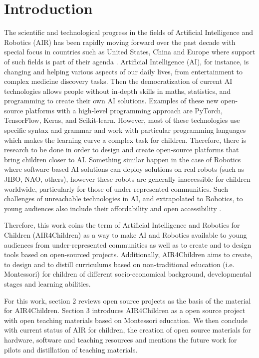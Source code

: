 \documentclass[sigconf]{acmart}
\begin{document}
\maketitle

\section{Introduction} 
The scientific and technological progress in the fields of Artificial Intelligence and Robotics (AIR) has been rapidly moving forward over the past decade with special focus in countries such as United States, China and Europe where support of such fields is part of their agenda \cite{Savage2020}. 
Artificial Intelligence (AI), for instance, is changing and helping various aspects of our daily lives, from entertainment to complex medicine discovery tasks. 
Then the democratization of current AI technologies allows people without in-depth skills in maths, statistics, and programming to create their own AI solutions. Examples of these new open-source platforms with a high-level programming approach are PyTorch, TensorFlow, Keras, and Scikit-learn. 
However, most of these technologies use specific syntax and grammar and work with particular programming languages which makes the learning curve a complex task for children. 
Therefore, there is research to be done in order to design and create open-source platforms that bring children closer to AI.
Something similar happen in the case of Robotics where software-based AI solutions can deploy solutions on real robots (such as JIBO, NAO, others), however these robots are generally inaccessible for children worldwide, particularly for those of under-represented communities.
Such challenges of unreachable technologies in AI, and extrapolated to Robotics, to young audiences 
also include their affordability and open accessibility \cite{UNICEF2020}.

Therefore, this work coins the term of Artificial Intelligence and Robotics for Children (AIR4Children) as a way to make AI and Robotics available to young audiences from under-represented communities as well as to create and to design tools based on open-sourced projects.
Additionally, AIR4Children aims to create, to design and to distill curriculums based on non-traditional education (i.e. Montessori) for children of different socio-economical background, developmental stages and learning abilities. 

For this work, section 2 reviews open source projects as the basis of the material for AIR4Children.
Section 3 introduces AIR4Children as a open source project with open teaching materials based on Montessori education. 
We then conclude with current status of AIR for children, the creation of open source materials for hardware, software and teaching resources and mentions the future work for pilots and distillation of teaching materials.
\end{document}
